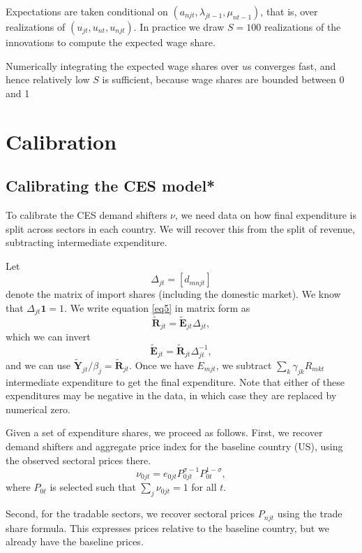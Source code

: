\documentclass[12pt]{article}
\begin{document}
Expectations are taken conditional on $(a_{njt}, \lambda_{jt-1}, \mu_{nt-1})$, that is, over realizations of $(u_{jt}, u_{nt}, u_{njt})$. In practice we draw $S=100$ realizations of the innovations to compute the expected wage share. 

Numerically integrating the expected wage shares over $u$s converges fast, and hence relatively low $S$ is sufficient, because wage shares are bounded between 0 and 1

\section{Calibration}
\subsection{Calibrating the CES model*}
To calibrate the CES demand shifters $\nu$, we need data on how final expenditure is split across sectors in each country. We will recover this from the split of revenue, subtracting intermediate expenditure.

Let
\[
\Delta_{jt} = [d_{mnjt}] 
\]
denote the matrix of import shares (including the domestic market). We know that $\Delta_{jt}\mathbf 1=1$. We write equation \eqref{eq5} in matrix form as
\begin{equation}
	\tilde {\mathbf R}_{jt} = \tilde {\mathbf E}_{jt}\Delta_{jt},
\end{equation}
which we can invert
\begin{equation}
	\tilde {\mathbf E}_{jt} = \tilde {\mathbf R}_{jt}\Delta_{jt}^{-1},
	\end{equation}
and we can use $\tilde {\mathbf Y}_{jt}/\beta_j = \tilde{\mathbf R}_{jt}$. Once we have $E_{mjt}$, we subtract $\sum_k\gamma_{jk}R_{mkt}$ intermediate expenditure to get the final expenditure. Note that either of these expenditures may be negative in the data, in which case they are replaced by numerical zero.

Given a set of expenditure shares, we proceed as follows. First, we recover demand shifters and aggregate price index for the baseline country (US), using the observed sectoral prices there.
\[
\nu_{0jt} = e_{0jt} P_{0jt}^{\sigma-1} P_{0t}^{1-\sigma},
\]
where $P_{0t}$ is selected such that $\sum_j \nu_{0jt}=1$ for all $t$.

Second, for the tradable sectors, we recover sectoral prices $P_{njt}$ using the trade share formula. This expresses prices relative to the baseline country, but we already have the baseline prices.
\end{document}
